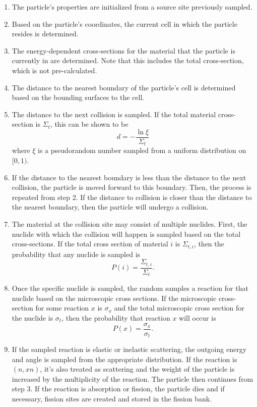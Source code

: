 \begin{enumerate}
\item The particle's properties are initialized from a source site previously
  sampled.
\item Based on the particle's coordinates, the current cell in which the
  particle resides is determined.
\item The energy-dependent cross-sections for the material that the particle is
  currently in are determined. Note that this includes the total cross-section,
  which is not pre-calculated.
\item The distance to the nearest boundary of the particle's cell is determined
  based on the bounding surfaces to the cell.
\item The distance to the next collision is sampled. If the total material
  cross-section is $\Sigma_t$, this can be shown to be
  \begin{equation}
    d = -\frac{\ln \xi}{\Sigma_t}
  \end{equation}
  where $\xi$ is a pseudorandom number sampled from a uniform distribution on
  $[0,1)$.
\item If the distance to the nearest boundary is less than the distance to the
  next collision, the particle is moved forward to this boundary. Then, the
  process is repeated from step 2. If the distance to collision is closer than
  the distance to the nearest boundary, then the particle will undergo a
  collision.
\item The material at the collision site may consist of multiple
  nuclides. First, the nuclide with which the collision will happen is sampled
  based on the total cross-sections. If the total cross section of material $i$
  is $\Sigma_{t,i}$, then the probability that any nuclide is sampled is
  \begin{equation}
    P(i) = \frac{\Sigma_{t,i}}{\Sigma_t}.
  \end{equation}
\item Once the specific nuclide is sampled, the random samples a reaction for
  that nuclide based on the microscopic cross sections. If the microscopic
  cross-section for some reaction $x$ is $\sigma_x$ and the total microscopic
  cross section for the nuclide is $\sigma_t$, then the probability that
  reaction $x$ will occur is
  \begin{equation}
    P(x) = \frac{\sigma_x}{\sigma_t}.
  \end{equation}
\item If the sampled reaction is elastic or inelastic scattering, the outgoing
  energy and angle is sampled from the appropriate distribution.  If the
  reaction is $(n,xn)$, it's also treated as scattering and the weight of the
  particle is increased by the multiplicity of the reaction. The particle then
  continues from step 3. If the reaction is absorption or fission, the particle
  dies and if necessary, fission sites are created and stored in the fission
  bank.
\end{enumerate}
